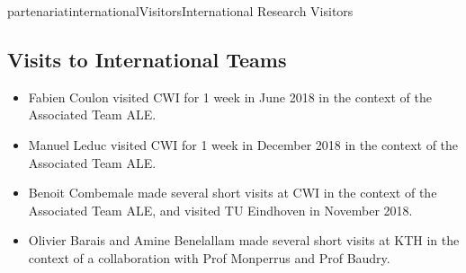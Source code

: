 \documentclass{ra2018}
\begin{document}
\begin{module}{partenariat}{internationalVisitors}{International Research Visitors}

\subsection{Visits to International Teams}


\begin{itemize}
\item Fabien Coulon visited CWI for 1 week in June 2018 in the context of the Associated Team ALE. 
\item Manuel Leduc visited CWI for 1 week in December 2018 in the context of the Associated Team ALE. 
\item Benoit Combemale made several short visits at CWI in the context of the Associated Team ALE, and visited TU Eindhoven in November 2018. 
\item Olivier Barais and Amine Benelallam made several short visits at KTH in the context of a collaboration with Prof Monperrus and Prof Baudry. 
\end{itemize}

   
   






\end{module}


\end{document}
